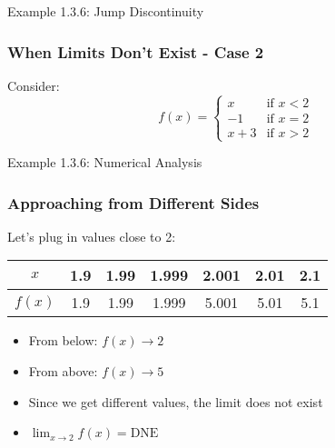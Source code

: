 \documentclass[aspectratio=169]{beamer}
\newcommand{\limx}[2]{\lim_{x \to #1} #2}
\begin{document}
\begin{frame}{Example 1.3.6: Jump Discontinuity}
\frametitle{When Limits Don't Exist - Case 2}

\begin{block}{Consider:}
$$f(x) = \begin{cases}
x & \text{if } x < 2 \\
-1 & \text{if } x = 2 \\
x + 3 & \text{if } x > 2
\end{cases}$$
\end{block}

\begin{center}
\end{center}

\end{frame}

\begin{frame}{Example 1.3.6: Numerical Analysis}
\frametitle{Approaching from Different Sides}

\begin{block}{Let's plug in values close to 2:}
\begin{center}
\begin{tabular}{|c|c|c|c|c|c|c|}
\hline
$x$ & 1.9 & 1.99 & 1.999 & 2.001 & 2.01 & 2.1 \\
\hline
$f(x)$ & 1.9 & 1.99 & 1.999 & 5.001 & 5.01 & 5.1 \\
\hline
\end{tabular}
\end{center}
\end{block}

\begin{itemize}
\item From below: $f(x) \to 2$
\item From above: $f(x) \to 5$
\item Since we get different values, the limit does not exist
\item $\limx{2}{f(x)} = \text{DNE}$
\end{itemize}

\end{frame}
\end{document}

